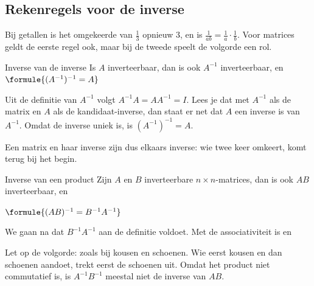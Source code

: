 \begin{oefeningen}
\end{oefeningen}

\subsection{Rekenregels voor de inverse}

Bij getallen is het omgekeerde van $\frac13$ opnieuw 3, en is $\frac{1}{ab} = \frac1a \cdot \frac1b$. Voor matrices geldt de eerste regel ook, maar bij de tweede speelt de volgorde een rol.

\begin{theorie}
\begin{stelling}{Inverse van de inverse}
Is $A$ inverteerbaar, dan is ook $A^{-1}$ inverteerbaar, en \qquad $\formule{(A^{-1})^{-1} = A}$
\end{stelling}

\begin{bewijs}
Uit de definitie van $A^{-1}$ volgt $A^{-1}A = AA^{-1} = I$. Lees je dat met $A^{-1}$ als de matrix en $A$ als de kandidaat-inverse, dan staat er net dat $A$ een inverse is van $A^{-1}$. Omdat de inverse uniek is, is $(A^{-1})^{-1} = A$.
\end{bewijs}
\end{theorie}

Een matrix en haar inverse zijn dus elkaars inverse: wie twee keer omkeert, komt terug bij het begin.

\begin{theorie}
\begin{stelling}{Inverse van een product}
Zijn $A$ en $B$ inverteerbare $n \times n$-matrices, dan is ook $AB$ inverteerbaar, en

\vspace{1mm}
\qquad $\formule{(AB)^{-1} = B^{-1}A^{-1}}$
\end{stelling}

\begin{bewijs}
We gaan na dat $B^{-1}A^{-1}$ aan de definitie voldoet. Met de associativiteit is
en
\end{bewijs}
\end{theorie}

Let op de volgorde: zoals bij kousen en schoenen. Wie eerst kousen en dan schoenen aandoet, trekt eerst de schoenen uit. Omdat het product niet commutatief is, is $A^{-1}B^{-1}$ meestal niet de inverse van $AB$.

